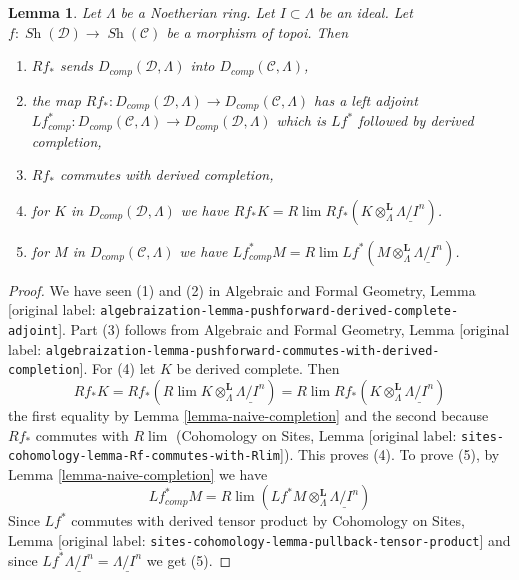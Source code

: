 \documentclass[10pt,a4paper]{article}
\theoremstyle{plain}
\newtheorem{lemma}[subsection]{Lemma}
\theoremstyle{definition}
\theoremstyle{remark}
\numberwithin{equation}{subsection}
\def\lim{\mathop{\mathrm{lim}}\nolimits}
\def\Sh{\mathop{\mathit{Sh}}\nolimits}
\begin{document}
\begin{lemma}
\label{lemma-pushforward-Noetherian-case}
Let $\Lambda$ be a Noetherian ring. Let $I \subset \Lambda$ be an ideal.
Let $f : \Sh(\mathcal{D}) \to \Sh(\mathcal{C})$ be a morphism of topoi.
Then
\begin{enumerate}
\item $Rf_*$ sends $D_{comp}(\mathcal{D}, \Lambda)$
into $D_{comp}(\mathcal{C}, \Lambda)$,
\item the map $Rf_* : D_{comp}(\mathcal{D}, \Lambda) \to
D_{comp}(\mathcal{C}, \Lambda)$ has a left adjoint
$Lf_{comp}^* : D_{comp}(\mathcal{C}, \Lambda) \to
D_{comp}(\mathcal{D}, \Lambda)$ which is $Lf^*$ followed by
derived completion,
\item $Rf_*$ commutes with derived completion,
\item for $K$ in $D_{comp}(\mathcal{D}, \Lambda)$ we have
$Rf_*K = R\lim Rf_*(K \otimes^\mathbf{L}_\Lambda \underline{\Lambda/I^n})$.
\item for $M$ in $D_{comp}(\mathcal{C}, \Lambda)$ we have
$Lf^*_{comp}M =
R\lim Lf^*(M \otimes^\mathbf{L}_\Lambda \underline{\Lambda/I^n})$.
\end{enumerate}
\end{lemma}

\begin{proof}
We have seen (1) and (2) in
Algebraic and Formal Geometry, Lemma
[original label: \nolinkurl{algebraization-lemma-pushforward-derived-complete-adjoint}].
Part (3) follows from
Algebraic and Formal Geometry, Lemma
[original label: \nolinkurl{algebraization-lemma-pushforward-commutes-with-derived-completion}].
For (4) let $K$ be derived complete. Then
$$
Rf_*K = Rf_*( R\lim K \otimes^\mathbf{L}_\Lambda \underline{\Lambda/I^n}) =
R\lim Rf_*(K \otimes^\mathbf{L}_\Lambda \underline{\Lambda/I^n})
$$
the first equality by Lemma \ref{lemma-naive-completion}
and the second because $Rf_*$ commutes with $R\lim$
(Cohomology on Sites, Lemma
[original label: \nolinkurl{sites-cohomology-lemma-Rf-commutes-with-Rlim}]). This proves (4).
To prove (5), by Lemma \ref{lemma-naive-completion} we have
$$
Lf_{comp}^*M =
R\lim ( Lf^*M \otimes_\Lambda^\mathbf{L} \underline{\Lambda/I^n})
$$
Since $Lf^*$ commutes with derived tensor product by
Cohomology on Sites, Lemma [original label: \nolinkurl{sites-cohomology-lemma-pullback-tensor-product}]
and since $Lf^*\underline{\Lambda/I^n} = \underline{\Lambda/I^n}$
we get (5).
\end{proof}
\end{document}
